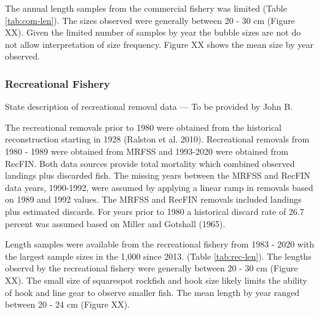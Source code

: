 \documentclass[11pt,
  english,
  a4paper,
]{article}
\begin{document}
The annual length samples from the commercial fishery was limited (Table \ref{tab:com-len}). The sizes observed were generally between 20 - 30 cm (Figure XX). Given the limited number of samples by year the bubble sizes are not do not allow interpretation of size frequency. Figure XX shows the mean size by year observed.

\leavevmode\tagmcend\tagstructend\par


\hypertarget{recreational-fishery}{%
\subsubsection{Recreational Fishery}\label{recreational-fishery}}

\leavevmode\tagmcend\tagstructend


State description of recreational removal data --- To be provided by John B.

\leavevmode\tagmcend\tagstructend\par


The recreational removals prior to 1980 were obtained from the historical reconstruction starting in 1928 {(Ralston et al. 2010)\leavevmode\tagmcend\tagstructend}. Recreational removals from 1980 - 1989 were obtained from MRFSS and 1993-2020 were obtained from RecFIN. Both data sources provide total mortality which combined observed landings plus discarded fish. The missing years between the MRFSS and RecFIN data years, 1990-1992, were assumed by applying a linear ramp in removals based on 1989 and 1992 values. The MRFSS and RecFIN removals included landings plus estimated discards. For years prior to 1980 a historical discard rate of 26.7 percent was assumed based on Miller and Gotshall {(1965)\leavevmode\tagmcend\tagstructend}.

\leavevmode\tagmcend\tagstructend\par


Length samples were available from the recreational fishery from 1983 - 2020 with the largest sample sizes in the 1,000 since 2013. (Table \ref{tab:rec-len}). The lengths observd by the recreational fishery were generally between 20 - 30 cm (Figure XX). The small size of squarespot rockfish and hook size likely limits the ability of hook and line gear to observe smaller fish. The mean length by year ranged between 20 - 24 cm (Figure XX).
\end{document}

